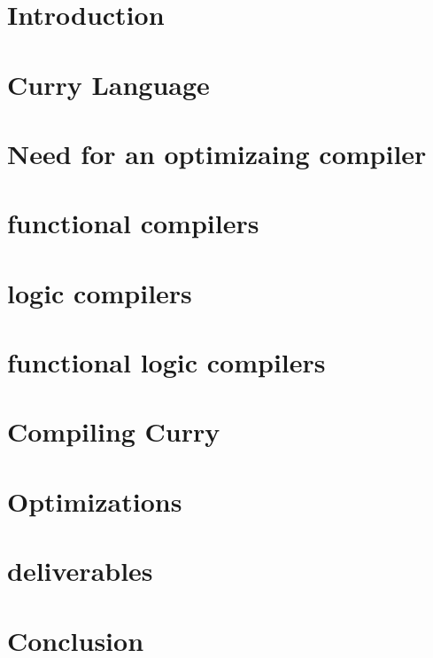 \documentclass{article}
\begin{document}
\begin{abstract}
    
\end{abstract}

\section{Introduction}


\section{Curry Language}


\section{Need for an optimizaing compiler}


\section{functional compilers}


\section{logic compilers}


\section{functional logic compilers}


\section{Compiling Curry}


\section{Optimizations}


\section{deliverables}


\section{Conclusion}





\end{document}
